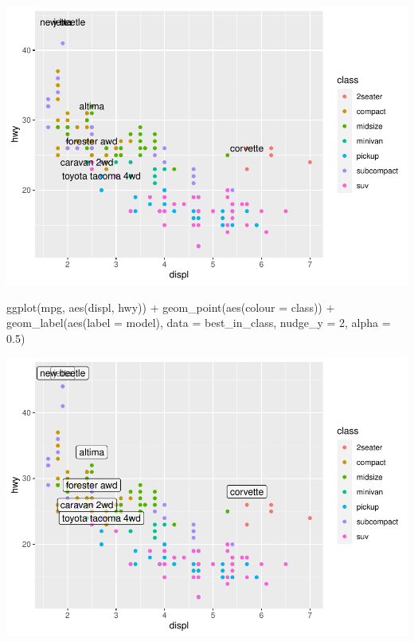 \documentclass[
]{article}
\newenvironment{Shaded}{\begin{snugshade}}{\end{snugshade}}
\newcommand{\AttributeTok}[1]{\textcolor[rgb]{0.77,0.63,0.00}{#1}}
\newcommand{\DecValTok}[1]{\textcolor[rgb]{0.00,0.00,0.81}{#1}}
\newcommand{\FloatTok}[1]{\textcolor[rgb]{0.00,0.00,0.81}{#1}}
\newcommand{\FunctionTok}[1]{\textcolor[rgb]{0.00,0.00,0.00}{#1}}
\newcommand{\NormalTok}[1]{#1}
\newcommand{\SpecialCharTok}[1]{\textcolor[rgb]{0.00,0.00,0.00}{#1}}
\begin{document}
\includegraphics{Journal_files/figure-latex/unnamed-chunk-58-1.pdf}

\begin{Shaded}
\begin{Highlighting}[]
\FunctionTok{ggplot}\NormalTok{(mpg, }\FunctionTok{aes}\NormalTok{(displ, hwy)) }\SpecialCharTok{+}
  \FunctionTok{geom\_point}\NormalTok{(}\FunctionTok{aes}\NormalTok{(}\AttributeTok{colour =}\NormalTok{ class)) }\SpecialCharTok{+}
  \FunctionTok{geom\_label}\NormalTok{(}\FunctionTok{aes}\NormalTok{(}\AttributeTok{label =}\NormalTok{ model), }\AttributeTok{data =}\NormalTok{ best\_in\_class, }\AttributeTok{nudge\_y =} \DecValTok{2}\NormalTok{, }\AttributeTok{alpha =} \FloatTok{0.5}\NormalTok{)}
\end{Highlighting}
\end{Shaded}

\includegraphics{Journal_files/figure-latex/unnamed-chunk-58-2.pdf}
\end{document}
